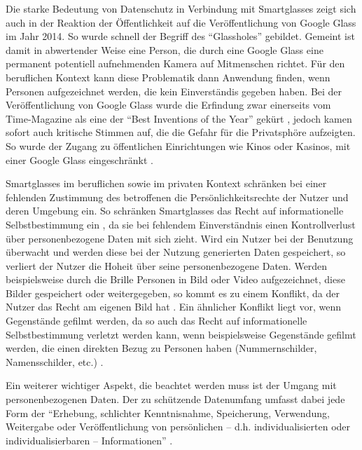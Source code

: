 Die starke Bedeutung von Datenschutz in Verbindung mit Smartglasses zeigt sich auch in der Reaktion der Öffentlichkeit auf die Veröffentlichung von Google Glass im Jahr 2014. So wurde schnell der Begriff des \enquote{Glassholes} \cite[S.~14]{ThomasDirkMetzgerHelmutNiegemannHrsg2018} gebildet. Gemeint ist damit in abwertender Weise eine Person, die durch eine Google Glass eine permanent potentiell aufnehmenden Kamera auf Mitmenschen richtet. Für den beruflichen Kontext kann diese Problematik dann Anwendung finden, wenn Personen aufgezeichnet werden, die kein Einverständis gegeben haben. Bei der Veröffentlichung von Google Glass wurde die Erfindung zwar einerseits vom Time-Magazine als eine der \enquote{Best Inventions of the Year} gekürt \cite{Bilton2015}, jedoch kamen sofort auch kritische Stimmen auf, die die Gefahr für die Privatsphöre aufzeigten. So wurde der Zugang zu öffentlichen Einrichtungen wie Kinos oder Kasinos, mit einer Google Glass eingeschränkt \cite[S.~67]{Schwenke2016}. 

Smartglasses im beruflichen  sowie im privaten Kontext schränken bei einer fehlenden Zustimmung des betroffenen die Persönlichkeitsrechte der Nutzer und deren Umgebung ein. So schränken Smartglasses das Recht auf informationelle Selbstbestimmung ein \cite[S.~100]{Schwenke2016}, da sie bei fehlendem Einverständnis einen Kontrollverlust über personenbezogene Daten mit sich zieht. Wird ein Nutzer bei der Benutzung überwacht und werden diese bei der Nutzung generierten Daten gespeichert, so verliert der Nutzer die Hoheit über seine personenbezogene Daten. Werden beispielsweise durch die Brille Personen in Bild oder Video aufgezeichnet, diese Bilder gespeichert oder weitergegeben, so kommt es zu einem Konflikt, da der Nutzer das Recht am eigenen Bild hat \cite[S.~104ff]{Schwenke2016} \cite[S.~109f]{Schwenke2016}. 
Ein ähnlicher Konflikt liegt vor, wenn Gegenstände gefilmt werden, da so auch das Recht auf informationelle Selbstbestimmung verletzt werden kann, wenn beispielsweise Gegenstände gefilmt werden, die einen direkten Bezug zu Personen haben (Nummernschilder, Namensschilder, etc.) \cite[S.~106]{Schwenke2016}. 

Ein weiterer wichtiger Aspekt, die beachtet werden muss ist der Umgang mit personenbezogenen Daten. Der zu schützende Datenumfang umfasst dabei jede Form der
\enquote{Erhebung, schlichter Kenntnisnahme, Speicherung, Verwendung, Weitergabe oder Veröffentlichung von persönlichen – d.h. individualisierten oder individualisierbaren – Informationen} \cite[S.~108]{Schwenke2016}.


